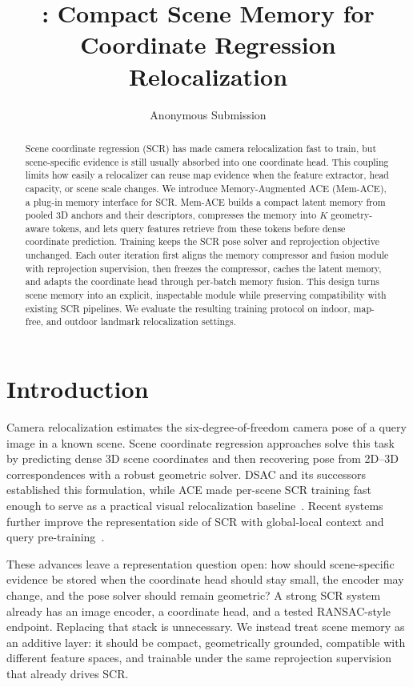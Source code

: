 \documentclass[letterpaper]{article} %
\title{\shortmethod{}: Compact Scene Memory for Coordinate Regression Relocalization}
\author{Anonymous Submission}
\newcommand{\method}{Memory-Augmented ACE}
\newcommand{\shortmethod}{Mem-ACE}
\begin{document}
\maketitle

\begin{abstract}
Scene coordinate regression (SCR) has made camera relocalization fast to train, but scene-specific evidence is still usually absorbed into one coordinate head. This coupling limits how easily a relocalizer can reuse map evidence when the feature extractor, head capacity, or scene scale changes. We introduce \method{} (\shortmethod{}), a plug-in memory interface for SCR. \shortmethod{} builds a compact latent memory from pooled 3D anchors and their descriptors, compresses the memory into $K$ geometry-aware tokens, and lets query features retrieve from these tokens before dense coordinate prediction. Training keeps the SCR pose solver and reprojection objective unchanged. Each outer iteration first aligns the memory compressor and fusion module with reprojection supervision, then freezes the compressor, caches the latent memory, and adapts the coordinate head through per-batch memory fusion. This design turns scene memory into an explicit, inspectable module while preserving compatibility with existing SCR pipelines. We evaluate the resulting training protocol on indoor, map-free, and outdoor landmark relocalization settings.
\end{abstract}

\section{Introduction}

Camera relocalization estimates the six-degree-of-freedom camera pose of a query image in a known scene. Scene coordinate regression approaches solve this task by predicting dense 3D scene coordinates and then recovering pose from 2D--3D correspondences with a robust geometric solver. DSAC and its successors established this formulation, while ACE made per-scene SCR training fast enough to serve as a practical visual relocalization baseline~\citep{brachmann2017dsac,brachmann2021dsacstar,brachmann2023ace}. Recent systems further improve the representation side of SCR with global-local context and query pre-training~\citep{GLACE2024CVPR,bruns2025aceg}.

These advances leave a representation question open: how should scene-specific evidence be stored when the coordinate head should stay small, the encoder may change, and the pose solver should remain geometric? A strong SCR system already has an image encoder, a coordinate head, and a tested RANSAC-style endpoint. Replacing that stack is unnecessary. We instead treat scene memory as an additive layer: it should be compact, geometrically grounded, compatible with different feature spaces, and trainable under the same reprojection supervision that already drives SCR.
\end{document}
